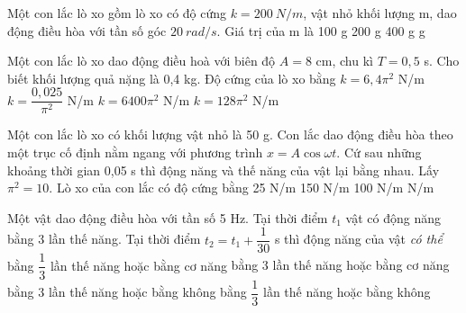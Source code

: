 \begin{ex}%
Một con lắc lò xo gồm lò xo có độ cứng $k=200\ N/m$, vật nhỏ khối lượng m, dao động điều hòa với tần số góc $20\ rad/s$. Giá trị của m là
\choice
{100 g}
{200 g}
{400 g}
{ g}
\end{ex} 
\begin{ex}%
Một con lắc lò xo dao động điều hoà với biên độ $A = 8$ cm, chu kì $T = 0,5$ s. Cho biết khối lượng quả nặng là 0,4 kg. Độ cứng của lò xo bằng
\choice
{\True $k = 6,4\pi^2$ N/m}
{$k = \dfrac{0,025}{\pi^2}$ N/m}
{$k = 6400\pi^2$ N/m}
{$k = 128\pi^2$ N/m}
\end{ex} 
\begin{ex}%
Một con lắc lò xo có khối lượng vật nhỏ là 50 g. Con lắc dao động điều hòa theo một trục cố định nằm ngang với phương trình $x = A\cos\omega t$. Cứ sau những khoảng thời gian 0,05 s thì động năng và thế năng của vật lại bằng nhau. Lấy $\pi^2 = 10$. Lò xo của con lắc có độ cứng bằng
\choice
{25 N/m}
{150 N/m}
{100 N/m}
{ N/m}
\end{ex} 
\begin{ex}%
Một vật dao động điều hòa với tần số 5 Hz. Tại thời điểm $t_1$ vật có động năng bằng 3 lần thế năng. Tại thời điểm ${t_2}={t_1}+\dfrac{1}{30}$  s thì động năng của vật \textit{có thể}
\choice
{bằng $ \dfrac{1}{3} $ lần thế năng hoặc bằng cơ năng}
{bằng 3 lần thế năng hoặc bằng cơ năng}
{\True bằng 3 lần thế năng hoặc bằng không}
{bằng $ \dfrac{1}{3} $ lần thế năng hoặc bằng không}
\end{ex} 
